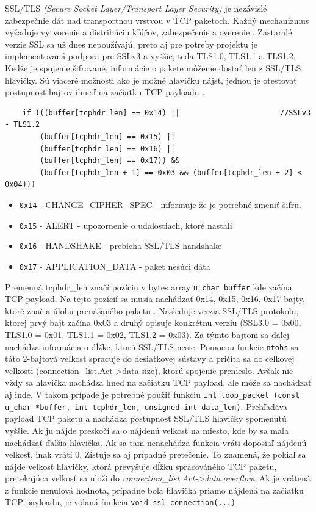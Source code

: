 \documentclass[11pt, a4paper]{article}
\begin{document}
	SSL/TLS \emph{(Secure Socket Layer/Transport Layer Security)} je nezávislé zabezpečnie dát nad transportnou vrstvou v TCP paketoch. Každý mechanizmus vyžaduje vytvorenie a distribúciu kľúčov, zabezpečenie a overenie \cite{prednaskaZabezpeceni}. Zastaralé verzie SSL sa už dnes nepoužívajú, preto aj pre potreby projektu je implementovaná podpora pre SSLv3 a vyššie, teda TLS1.0, TLS1.1 a TLS1.2. \\
	 
	 Kedže je spojenie šifrované, informácie o pakete môžeme dostať len z SSL/TLS hlavičky. Sú viaceré možnosti ako je možné hlavičku nájsť, jednou je otestovať postupnosť bajtov ihneď na začiatku TCP payloadu \cite{sslheader}. 
\begin{lstlisting}
	if (((buffer[tcphdr_len] == 0x14) ||                       //SSLv3 - TLS1.2
		(buffer[tcphdr_len] == 0x15) ||
		(buffer[tcphdr_len] == 0x16) ||
		(buffer[tcphdr_len] == 0x17)) &&
		(buffer[tcphdr_len + 1] == 0x03 && (buffer[tcphdr_len + 2] < 0x04)))
\end{lstlisting}	

\begin{itemize}
	\item \texttt{0x14} - CHANGE\_CIPHER\_SPEC - informuje že je potrebné zmeniť šifru.
	\item \texttt{0x15} - ALERT - upozornenie o udalostiach, ktoré nastali
	\item \texttt{0x16} - HANDSHAKE - prebieha SSL/TLS handshake
	\item \texttt{0x17} - APPLICATION\_DATA - paket nesúci dáta
\end{itemize}

Premenná tcphdr\_len značí pozíciu v bytes array \texttt{u\_char buffer} kde začína TCP payload. Na tejto pozícií sa musia nachádzať 0x14, 0x15, 0x16, 0x17 bajty, ktoré značia úlohu prenášaného paketu \cite{ssltraffic}. Nasleduje verzia SSL/TLS protokolu, ktorej prvý bajt začína 0x03 a druhý opisuje konkrétnu verziu (SSL3.0 = 0x00, TLS1.0 = 0x01, TLS1.1 = 0x02, TLS1.2 =  0x03). Za týmto bajtom sa ďalej nachádza informácia o dĺžke, ktorú SSL/TLS nesie. Pomocou funkcie \texttt{ntohs} sa táto 2-bajtová veľkosť spracuje do desiatkovej sústavy a pričíta sa do celkovej veľkosti (connection\_list.Act->data.size), ktorú spojenie prenieslo. Avšak nie vždy sa hlavička nachádza hneď na začiatku TCP payload, ale môže sa nachádzať aj inde.
	V takom prípade je potrebné použiť funkciu \texttt{int loop\_packet (const u\_char *buffer, int tcphdr\_len, unsigned int data\_len)}. Prehľadáva payload TCP paketu a nachádza postupnosť SSL/TLS hlavičky spomenutú vyššie. Ak ju nájde preskočí sa o nájdenú velkosť na miesto, kde by sa mala nachádzať ďalšia hlavička. Ak sa tam nenachádza funkcia vráti doposiaľ nájdenú velkosť, inak vráti 0. Zisťuje sa aj prípadné pretečenie. To znamená, že pokiaľ sa nájde velkosť hlavičky, ktorá prevyšuje dĺžku spracováného TCP paketu, pretekajúca velkosť sa uloži do \emph{connection\_list.Act->data.overflow}. Ak je vrátená z funkcie nenulová hodnota, prípadne bola hlavička priamo nájdená na začiatku TCP payloadu, je volaná funkcia \texttt{void ssl\_connection(...)}. \\
	
\end{document}
